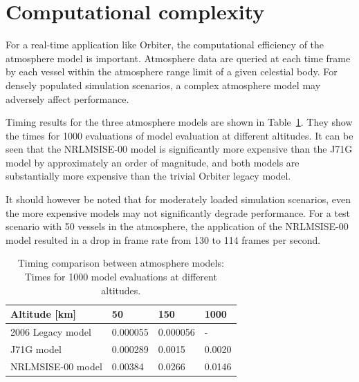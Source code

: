 \documentclass[a4paper]{article}
\begin{document}
\section {Computational complexity}
For a real-time application like Orbiter, the computational efficiency of the atmosphere model is important. Atmosphere data are queried at each time frame by each vessel within the atmosphere range limit of a given celestial body. For densely populated simulation scenarios, a complex atmosphere model may adversely affect performance.

Timing results for the three atmosphere models are shown in Table~\ref{tab:timing}. They show the times for 1000 evaluations of model evaluation at different altitudes. It can be seen that the NRLMSISE-00 model is significantly more expensive than the J71G model by approximately an order of magnitude, and both models are substantially more expensive than the trivial Orbiter legacy model.

It should however be noted that for moderately loaded simulation scenarios, even the more expensive models may not significantly degrade performance. For a test scenario with 50 vessels in the atmosphere, the application of the NRLMSISE-00 model resulted in a drop in frame rate from 130 to 114 frames per second.
\begin{table}
\begin{tabular}{l|lll}
Altitude [km] & 50 & 150 & 1000 \\ \hline
2006 Legacy model & 0.000055 & 0.000056 & - \\
J71G model & 0.000289 & 0.0015 & 0.0020 \\
NRLMSISE-00 model & 0.00384 & 0.0266 & 0.0146
\end{tabular}
\caption{Timing comparison between atmosphere models: Times for 1000 model evaluations at different altitudes.}
\label{tab:timing}
\end{table}


\end{document}
